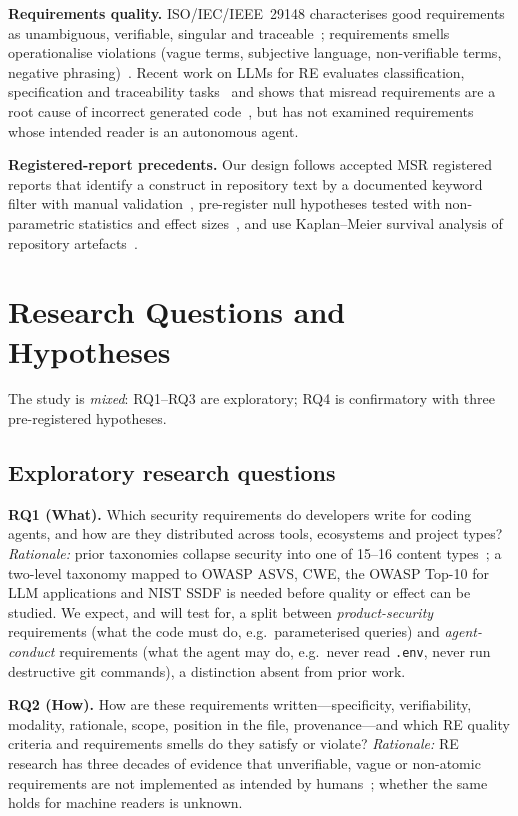 \documentclass[10pt,conference]{IEEEtran}
\begin{document}
\textbf{Requirements quality.} ISO/IEC/IEEE~29148 characterises good requirements as unambiguous, verifiable, singular and traceable~\cite{iso29148}; requirements smells operationalise violations (vague terms, subjective language, non-verifiable terms, negative phrasing)~\cite{femmer2017smells}. Recent work on LLMs for RE evaluates classification, specification and traceability tasks~\cite{dabrowski2026llm4re} and shows that misread requirements are a root cause of incorrect generated code~\cite{li2026reacoder}, but has not examined requirements whose intended reader is an autonomous agent.

\textbf{Registered-report precedents.} Our design follows accepted MSR registered reports that identify a construct in repository text by a documented keyword filter with manual validation~\cite{hennig2023privacy}, pre-register null hypotheses tested with non-parametric statistics and effect sizes~\cite{recupito2024smells}, and use Kaplan--Meier survival analysis of repository artefacts~\cite{koohjani2025ptm}.

\section{Research Questions and Hypotheses}

The study is \emph{mixed}: RQ1--RQ3 are exploratory; RQ4 is confirmatory with three pre-registered hypotheses.

\subsection{Exploratory research questions}

\textbf{RQ1 (What).} Which security requirements do developers write for coding agents, and how are they distributed across tools, ecosystems and project types? \emph{Rationale:} prior taxonomies collapse security into one of 15--16 content types~\cite{chatlatanagulchai2025manifests,chatlatanagulchai2026readmes}; a two-level taxonomy mapped to OWASP ASVS, CWE, the OWASP Top-10 for LLM applications and NIST SSDF is needed before quality or effect can be studied. We expect, and will test for, a split between \emph{product-security} requirements (what the code must do, e.g.\ parameterised queries) and \emph{agent-conduct} requirements (what the agent may do, e.g.\ never read \texttt{.env}, never run destructive git commands), a distinction absent from prior work.

\textbf{RQ2 (How).} How are these requirements written---specificity, verifiability, modality, rationale, scope, position in the file, provenance---and which RE quality criteria and requirements smells do they satisfy or violate? \emph{Rationale:} RE research has three decades of evidence that unverifiable, vague or non-atomic requirements are not implemented as intended by humans~\cite{femmer2017smells}; whether the same holds for machine readers is unknown.
\end{document}
